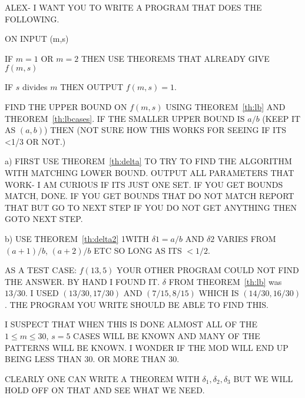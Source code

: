 \documentclass[12pt]{article}
\begin{document}
ALEX- I WANT YOU TO WRITE A PROGRAM THAT DOES THE FOLLOWING.

ON INPUT (m,s)

IF $m=1$ OR $m=2$ THEN USE THEOREMS THAT ALREADY GIVE $f(m,s)$

IF $s$ divides $m$ THEN OUTPUT $f(m,s)=1$.

FIND THE UPPER BOUND ON $f(m,s)$ USING THEOREM~\ref{th:lb} AND THEOREM~\ref{th:lbcases}.
IF THE SMALLER UPPER BOUND IS $a/b$ (KEEP IT AS $(a,b)$) THEN 
(NOT SURE HOW THIS WORKS FOR SEEING IF ITS <1/3 OR NOT.)

a) FIRST USE THEOREM~\ref{th:delta} TO TRY TO FIND THE ALGORITHM WITH MATCHING LOWER BOUND.
OUTPUT ALL PARAMETERS THAT WORK- I AM CURIOUS IF ITS JUST ONE SET.
IF YOU GET BOUNDS MATCH, DONE.
IF YOU GET BOUNDS THAT DO NOT MATCH REPORT THAT BUT GO TO NEXT STEP
IF YOU DO NOT GET ANYTHING THEN GOTO NEXT STEP.

b) USE THEOREM~\ref{th:delta2} 1WITH $\delta1=a/b$ AND $\delta2$ VARIES FROM $(a+1)/b$, $(a+2)/b$
ETC SO LONG AS ITS $< 1/2$. 

AS A TEST CASE: $f(13,5)$ YOUR OTHER PROGRAM COULD NOT FIND THE ANSWER.
BY HAND I FOUND IT. $\delta$ FROM THEOREM~\ref{th:lb} was $13/30$.
I USED $(13/30,17/30)$ AND $(7/15,8/15)$ WHICH IS $(14/30,16/30)$.
THE PROGRAM YOU WRITE SHOULD BE ABLE TO FIND THIS.

I SUSPECT THAT WHEN THIS IS DONE ALMOST ALL OF THE $1\le m\le 30$, $s=5$ CASES WILL BE KNOWN
AND MANY OF THE PATTERNS WILL BE KNOWN. I WONDER IF THE MOD WILL END UP BEING LESS THAN 30.
OR MORE THAN 30.

CLEARLY ONE CAN WRITE A THEOREM WITH $\delta_1,\delta_2,\delta_3$ BUT WE WILL HOLD OFF ON THAT
AND SEE WHAT WE NEED.
\end{document}
